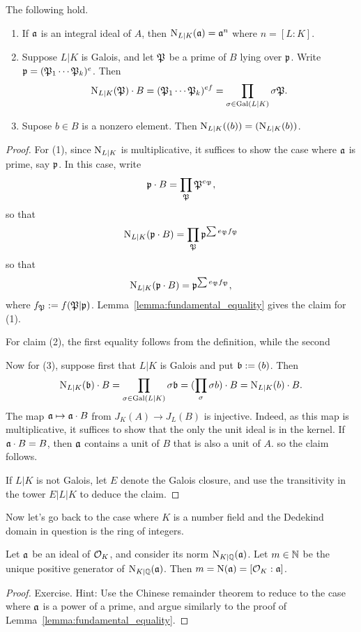 \begin{lemma}
  The following hold.
  \begin{enumerate}
    \item If $\mathfrak{a}$ is an integral ideal of $A$, then $\operatorname{N}_{L|K}(\mathfrak{a}) = \mathfrak{a}^n$ where $n = [L:K]$.
    \item Suppose $L|K$ is Galois, and let $\mathfrak{P}$ be a prime of $B$ lying over $\mathfrak{p}$.
          Write $\mathfrak{p} = (\mathfrak{P}_{1} \cdots \mathfrak{P}_{k})^{e}$.
          Then
          \[ \operatorname{N}_{L|K}(\mathfrak{P}) \cdot B = (\mathfrak{P}_{1} \cdots \mathfrak{P}_{k})^{ef} = \prod_{\sigma \in \operatorname{Gal}(L|K)} \sigma \mathfrak{P}. \]
    \item Supose $b \in B$ is a nonzero element.
          Then $\operatorname{N}_{L|K}((b)) = (\operatorname{N}_{L|K}(b))$.
  \end{enumerate}
\end{lemma}
\begin{proof}
  For (1), since $\operatorname{N}_{L|K}$ is multiplicative, it suffices to show the case where $\mathfrak{a}$ is prime, say $\mathfrak{p}$.
  In this case, write
  \[ \mathfrak{p} \cdot B = \prod_{\mathfrak{P}}\mathfrak{P}^{e_{\mathfrak{P}}}, \]
  so that
  \[ \operatorname{N}_{L|K}(\mathfrak{p} \cdot B) = \prod_{\mathfrak{P}} \mathfrak{p}^{\sum e_{\mathfrak{P}} f_{\mathfrak{P}}}\]
  so that
  \[ \operatorname{N}_{L|K}(\mathfrak{p} \cdot B) = \mathfrak{p}^{\sum e_{\mathfrak{P}} f_{\mathfrak{P}}},\]
  where $f_{\mathfrak{P}} := f(\mathfrak{P}|\mathfrak{p})$.
  Lemma~\ref{lemma:fundamental_equality} gives the claim for (1).

  For claim (2), the first equality follows from the definition, while the second 

  Now for (3), suppose first that $L|K$ is Galois and put $\mathfrak{b} := (b)$.
  Then
  \[ \operatorname{N}_{L|K}(\mathfrak{b}) \cdot B = \prod_{\sigma \in \operatorname{Gal}(L|K)} \sigma \mathfrak{b} = (\prod_{\sigma} \sigma b) \cdot B = \operatorname{N}_{L|K}(b) \cdot B. \]
  The map $\mathfrak{a} \mapsto \mathfrak{a} \cdot B$ from $J_{K}(A) \to J_{L}(B)$ is injective.
  Indeed, as this map is multiplicative, it suffices to show that the only the unit ideal is in the kernel.
  If $\mathfrak{a} \cdot B = B$, then $\mathfrak{a}$ contains a unit of $B$ that is also a unit of $A$. 
  so the claim follows.

  If $L|K$ is not Galois, let $E$ denote the Galois closure, and use the transitivity in the tower $E|L|K$ to deduce the claim.
\end{proof}

Now let's go back to the case where $K$ is a number field and the Dedekind domain in question is the ring of integers.
\begin{lemma}
  Let $\mathfrak{a}$ be an ideal of $\mathcal{O}_{K}$, and consider its norm $\operatorname{N}_{K|\mathbb{Q}}(\mathfrak{a})$.
  Let $m \in \mathbb{N}$ be the unique positive generator of $\operatorname{N}_{K|\mathbb{Q}}(\mathfrak{a})$.
  Then $m = \operatorname{N}(\mathfrak{a}) = [\mathcal{O}_{K}:\mathfrak{a}]$.
\end{lemma}
\begin{proof}
  Exercise.
  Hint: Use the Chinese remainder theorem to reduce to the case where $\mathfrak{a}$ is a power of a prime, and argue similarly to the proof of Lemma~\ref{lemma:fundamental_equality}.
\end{proof}

